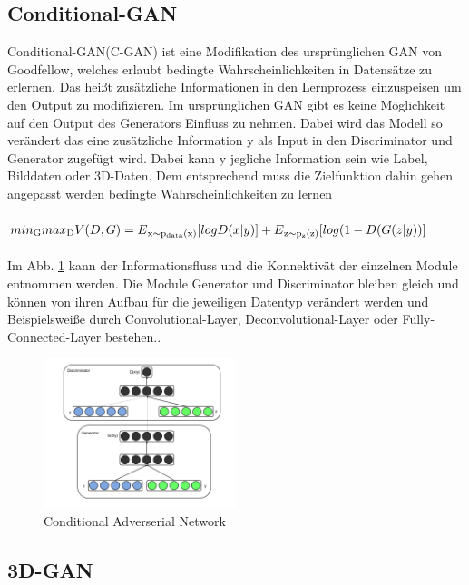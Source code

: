 \documentclass{llncs}
\begin{document}
\subsection{Conditional-GAN}

Conditional-GAN(C-GAN) ist eine Modifikation des ursprünglichen GAN von Goodfellow, welches erlaubt bedingte Wahrscheinlichkeiten in Datensätze zu erlernen. Das heißt zusätzliche Informationen in den Lernprozess einzuspeisen um den Output zu modifizieren. Im ursprünglichen GAN gibt es keine Möglichkeit auf den Output des Generators Einfluss zu nehmen. Dabei wird das Modell so verändert das eine zusätzliche Information y als Input in den Discriminator und Generator zugefügt wird. Dabei kann y jegliche Information sein wie Label, Bilddaten oder 3D-Daten. Dem entsprechend muss die Zielfunktion dahin gehen angepasst werden bedingte Wahrscheinlichkeiten zu lernen
\\\\
\begin{math}
min\textsubscript{G} max\textsubscript{D}V(D,G)=E\textsubscript{x$\sim$p\textsubscript{data}(x)}[logD(x|y)]  + E\textsubscript{z$\sim$p\textsubscript{z}(z)}[log(1-D(G(z|y))]          
\end{math}
\\\\
Im Abb. \ref{fig:Bild38} kann der Informationsfluss und die Konnektivät der einzelnen Module entnommen werden. Die Module Generator und Discriminator bleiben gleich und können von ihren Aufbau für die jeweiligen Datentyp verändert werden und Beispielsweiße durch Convolutional-Layer, Deconvolutional-Layer oder Fully-Connected-Layer bestehen.\cite{dcgan}.

\begin{figure}[htbp] 
	\centering
	\includegraphics[width=0.5\textwidth]{cgan.png}
	\caption{Conditional Adverserial Network}
	\label{fig:Bild38}
\end{figure}

\subsection{3D-GAN}\label{sec:3dgan}
\end{document}
